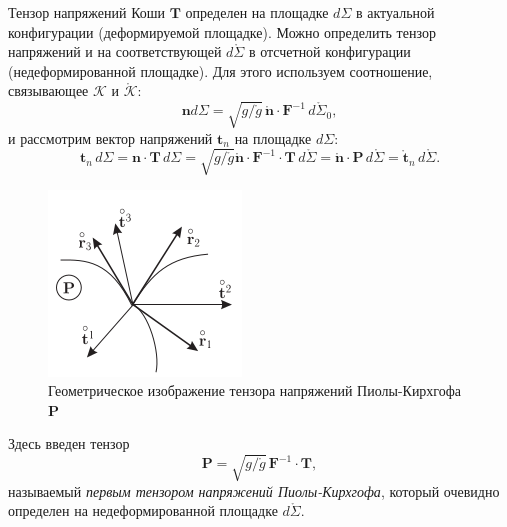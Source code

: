 Тензор напряжений Коши $\mathbf{T}$ определен на площадке $d\Sigma$ в актуальной конфигурации (деформируемой площадке). Можно определить тензор напряжений и на соответствующей $d\mathring{\Sigma}$ в отсчетной конфигурации (недеформированной площадке). Для этого используем соотношение, связывающее $\mathcal{K}$ и $\mathring{\mathcal{K}}$:
\begin{equation*}
	\mathbf{n} d\Sigma = \sqrt{g / \mathring{g}} \, \mathring{\mathbf{n}} \cdot \mathbf{F}^{-1} \, d\mathring{\Sigma}_0,
\end{equation*} 
и рассмотрим вектор напряжений $\mathbf{t}_n$ на площадке $d\Sigma$:
\begin{equation*}
	\mathbf{t}_n \, d\Sigma = \mathbf{n} \cdot \mathbf{T} \, d\Sigma = \sqrt{g / \mathring{g}} \mathring{\mathbf{n}} \cdot \mathbf{F}^{-1} \cdot \mathbf{T} \, d\mathring{\Sigma} = \mathring{\mathbf{n}} \cdot \mathbf{P} \, d\mathring{\Sigma} = \mathring{\mathbf{t}}_n \, d\mathring{\Sigma}.
\end{equation*}

\begin{figure}
	\centering
	\includegraphics[width=0.7\linewidth]{img/que18_4}
	\caption{Геометрическое изображение тензора напряжений Пиолы-Кирхгофа $\mathbf{P}$}
	\label{fig:que18_4}
\end{figure}


Здесь введен тензор 
\begin{equation*}
	\mathbf{P} = \sqrt{g / \mathring{g}} \, \mathbf{F}^{-1} \cdot \mathbf{T},
\end{equation*}
называемый \textit{первым тензором напряжений Пиолы-Кирхгофа}, который очевидно определен на недеформированной площадке $d\mathring{\Sigma}$. 

